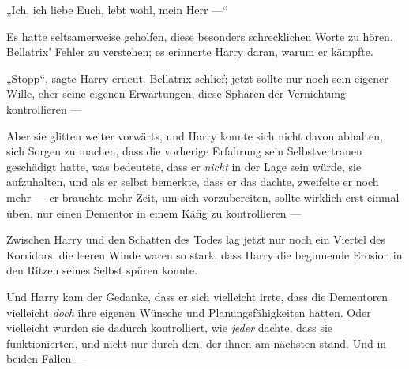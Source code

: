 „Ich, ich liebe Euch, lebt wohl, mein Herr —“


Es hatte seltsamerweise geholfen, diese besonders schrecklichen Worte zu hören, Bellatrix’ Fehler zu verstehen; es erinnerte Harry daran, warum er kämpfte.

„Stopp“, sagte Harry erneut. Bellatrix schlief; jetzt sollte nur noch sein eigener Wille, eher seine eigenen Erwartungen, diese Sphären der Vernichtung kontrollieren —

Aber sie glitten weiter vorwärts, und Harry konnte sich nicht davon abhalten, sich Sorgen zu machen, dass die vorherige Erfahrung sein Selbstvertrauen geschädigt hatte, was bedeutete, dass er \emph{nicht} in der Lage sein würde, sie aufzuhalten, und als er selbst bemerkte, dass er das dachte, zweifelte er noch mehr — er brauchte mehr Zeit, um sich vorzubereiten, sollte wirklich erst einmal üben, nur einen Dementor in einem Käfig zu kontrollieren —

Zwischen Harry und den Schatten des Todes lag jetzt nur noch ein Viertel des Korridors, die leeren Winde waren so stark, dass Harry die beginnende Erosion in den Ritzen seines Selbst spüren konnte.

Und Harry kam der Gedanke, dass er sich vielleicht irrte, dass die Dementoren vielleicht \emph{doch} ihre eigenen Wünsche und Planungsfähigkeiten hatten. Oder vielleicht wurden sie dadurch kontrolliert, wie \emph{jeder} dachte, dass sie funktionierten, und nicht nur durch den, der ihnen am nächsten stand. Und in beiden Fällen —

